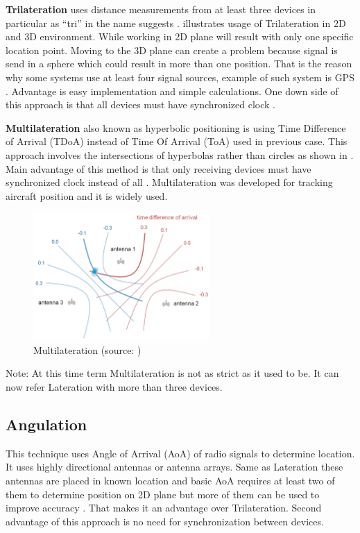 \textbf{Trilateration} uses distance measurements from at least three devices in particular as \enquote{tri} in the name suggests \cite{RAinWILTaS}.  illustrates usage of Trilateration in 2D and 3D environment. While working in 2D plane will result with only one specific location point. Moving to the 3D plane can create a problem because signal is send in a sphere which could result in more than one position. That is the reason why some systems use at least four signal sources, example of such system is GPS \cite{GNSSGPS}. Advantage is easy implementation and simple calculations. One down side of this approach is that all devices must have synchronized clock \cite{RAinWILTaS}.

\medskip

\textbf{Multilateration} also known as hyperbolic positioning is using Time Difference of Arrival (TDoA) instead of Time Of Arrival (ToA) used in previous case. This approach involves the intersections of hyperbolas rather than circles as shown in . Main advantage of this method is that only receiving devices must have synchronized clock instead of all \cite{PLTaA}. Multilateration was developed for tracking aircraft position and it is widely used.

\begin{figure}[h!]
	\begin{centering}
		\includegraphics[width=0.6\textwidth]{img/multilateration}
		\par\end{centering}
	\caption{Multilateration (source: \cite{HPwAA})\label{fig:Multilateration}}
	\label{fig3}
\end{figure}

Note: At this time term Multilateration is not as strict as it used to be. It can now refer Lateration with more than three devices.

\subsection{Angulation}\label{sec:Angulation}
This technique uses Angle of Arrival (AoA) of radio signals to determine location. It uses highly directional antennas or antenna arrays. Same as Lateration these antennas are placed in known location and basic AoA requires at least two of them to determine position on 2D plane but more of them can be used to improve accuracy \cite{RAinWILTaS}. That makes it an advantage over Trilateration. Second advantage of this approach is no need for synchronization between devices.

